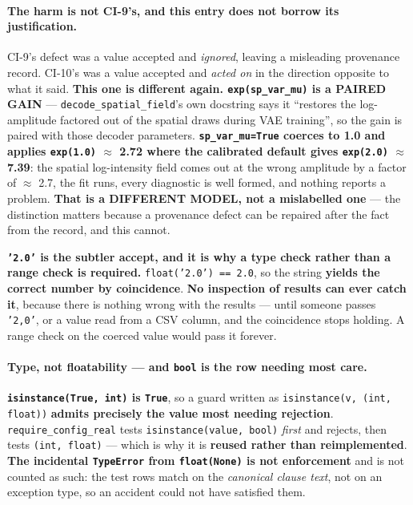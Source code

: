\documentclass[
  10pt,
]{article}
\begin{document}
\paragraph{The harm is not CI-9's, and this entry does not borrow its justification.}
CI-9's defect was a value accepted and \emph{ignored}, leaving a misleading provenance record. CI-10's was a value accepted and \emph{acted on} in the direction opposite to what it said. \textbf{This one is different again. \texttt{exp(sp\_var\_mu)} is a PAIRED GAIN} --- \texttt{decode\_spatial\_field}'s own docstring says it ``restores the log-amplitude factored out of the spatial draws during VAE training'', so the gain is paired with those decoder parameters. \textbf{\texttt{sp\_var\_mu=True} coerces to 1.0 and applies \texttt{exp(1.0)} $\approx$ 2.72 where the calibrated default gives \texttt{exp(2.0)} $\approx$ 7.39}: the spatial log-intensity field comes out at the wrong amplitude by a factor of $\approx$ 2.7, the fit runs, every diagnostic is well formed, and nothing reports a problem. \textbf{That is a DIFFERENT MODEL, not a mislabelled one} --- the distinction matters because a provenance defect can be repaired after the fact from the record, and this cannot.

\textbf{\texttt{'2.0'} is the subtler accept, and it is why a type check rather than a range check is required.} \texttt{float('2.0') == 2.0}, so the string \textbf{yields the correct number by coincidence}. \textbf{No inspection of results can ever catch it}, because there is nothing wrong with the results --- until someone passes \texttt{'2,0'}, or a value read from a CSV column, and the coincidence stops holding. A range check on the coerced value would pass it forever.

\paragraph{Type, not floatability --- and \texttt{bool} is the row needing most care.}
\textbf{\texttt{isinstance(True, int)} is \texttt{True}}, so a guard written as \texttt{isinstance(v, (int, float))} \textbf{admits precisely the value most needing rejection}. \texttt{require\_config\_real} tests \texttt{isinstance(value, bool)} \emph{first} and rejects, then tests \texttt{(int, float)} --- which is why it is \textbf{reused rather than reimplemented}. \textbf{The incidental \texttt{TypeError} from \texttt{float(None)} is not enforcement} and is not counted as such: the test rows match on the \emph{canonical clause text}, not on an exception type, so an accident could not have satisfied them.
\end{document}
